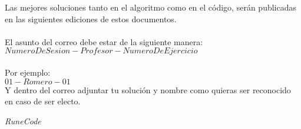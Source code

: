 \documentclass{article}
\begin{document}
Las mejores soluciones tanto en el algoritmo como en el código, serán
publicadas en las siguientes ediciones de estos documentos.\\ \\

El asunto del correo debe estar de la siguiente manera:\\
$NumeroDeSesion-Profesor-NumeroDeEjercicio$ \\ \\
Por ejemplo:  \\
$01-Romero-01$ \\

Y dentro del correo adjuntar tu solución y nombre como quieras ser reconocido en caso de ser electo.

\vspace{2cm}
\LARGE\textit{RuneCode}
\end{document}
